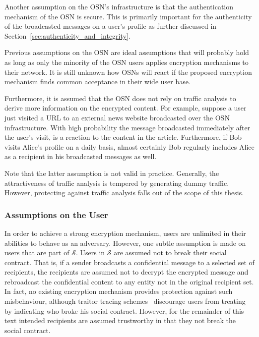 Another assumption on the OSN's infrastructure is that the authentication mechanism of the OSN is secure. This is primarily important for the authenticity of the broadcasted messages on a user's profile as further discussed in Section~\ref{sec:authenticity_and_integrity}.

Previous assumptions on the OSN are ideal assumptions that will probably hold as long as only the minority of the OSN users applies encryption mechanisms to their network. It is still unknown how OSNs will react if the proposed encryption mechanism finds common acceptance in their wide user base.

Furthermore, it is assumed that the OSN does not rely on traffic analysis to derive more information on the encrypted content. For example, suppose a user just visited a URL to an external news website broadcasted over the OSN infrastructure. With high probability the message broadcasted immediately after the user's visit, is a reaction to the content in the article. Furthermore, if Bob visits Alice's profile on a daily basis, almost certainly Bob regularly includes Alice as a recipient in his broadcasted messages as well.

Note that the latter assumption is not valid in practice. Generally, the attractiveness of traffic analysis is tempered by generating dummy traffic. However, protecting against traffic analysis falls out of the scope of this thesis.

\subsubsection{Assumptions on the User}

In order to achieve a strong encryption mechanism, users are unlimited in their abilities to behave as an adversary. However, one subtle assumption is made on users that are part of $\mathcal{S}$. Users in $\mathcal{S}$ are assumed not to break their social contract. That is, if a sender broadcasts a confidential message to a selected set of recipients, the recipients are assumed not to decrypt the encrypted message and rebroadcast the confidential content to any entity not in the original recipient set. In fact, no existing encryption mechanism provides protection against such misbehaviour, although traitor tracing schemes~\cite{art:ChorFNP00} discourage users from treating by indicating who broke his social contract. However, for the remainder of this text intended recipients are assumed trustworthy in that they not break the social contract.

